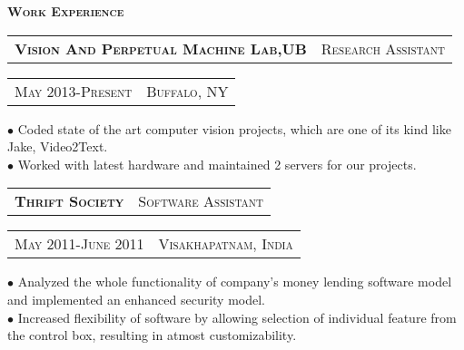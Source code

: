 \documentclass[10pt,a4paper,oneside]{article}
\begin{document}
    \textcolor{light-gray}{\textbf{\large W\textsc{ork} E\textsc{xperience}}}
    \vspace{4pt}\\
    \begin{tabular}{c|c}
        \textbf{\normalsize V\textsc{ision} A\textsc{nd} P\textsc{erpetual} M\textsc{achine} L\textsc{ab},UB}
        &\textmd{\normalsize R\textsc{esearch} A\textsc{ssistant}}
    \end{tabular}
    \hspace{1.71in}
    \textcolor{light-gray}{
        \begin{tabular}{c|c}
            {\small M\textsc{ay 2013}-P\textsc{resent}}
           &{\small B\textsc{uffalo}, NY}
        \end{tabular}
    } 
    \vspace{-4mm}
    \begin{adjustwidth}{7pt}{0pt}
        {\footnotesize $\bullet$ Coded state of the art computer vision projects, which are one of its kind like Jake, Video2Text.\\
        $\bullet$ Worked with latest hardware and maintained 2 servers for our projects. }\\
   \end{adjustwidth}
    \vspace{-2mm}
    \begin{tabular}{c|c}
        \textbf{\normalsize T\textsc{hrift} S\textsc{ociety}}
        &\textmd{\normalsize S\textsc{oftware} A\textsc{ssistant}}
    \end{tabular}
    \hspace{2.55in}
    \textcolor{light-gray}{
        \begin{tabular}{c|c}
            {\small M\textsc{ay 2011}-J\textsc{une 2011}}
            &{\small V\textsc{isakhapatnam}, I\textsc{ndia}}
        \end{tabular}
    } 
    \vspace{-4mm}
    \begin{adjustwidth}{7pt}{0pt}
        {\footnotesize $\bullet$ Analyzed the whole functionality of company's money lending software model and implemented an enhanced security  model.\\
        $\bullet$ Increased flexibility of software by allowing selection of individual feature from the control box, resulting in atmost customizability.}\\
    \end{adjustwidth}
\end{document}
